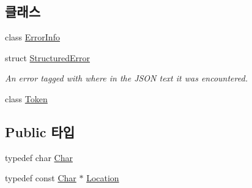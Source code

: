 \subsection*{클래스}
\begin{DoxyCompactItemize}
\item 
class \hyperlink{class_json_1_1_reader_1_1_error_info}{Error\+Info}
\item 
struct \hyperlink{struct_json_1_1_reader_1_1_structured_error}{Structured\+Error}
\begin{DoxyCompactList}\small\item\em An error tagged with where in the J\+S\+ON text it was encountered. \end{DoxyCompactList}\item 
class \hyperlink{class_json_1_1_reader_1_1_token}{Token}
\end{DoxyCompactItemize}
\subsection*{Public 타입}
\begin{DoxyCompactItemize}
\item 
typedef char \hyperlink{class_json_1_1_reader_a3eec9118f3e9a672ba8348c3a79d0f45}{Char}
\item 
typedef const \hyperlink{class_json_1_1_reader_a3eec9118f3e9a672ba8348c3a79d0f45}{Char} $\ast$ \hyperlink{class_json_1_1_reader_a46795b5b272bf79a7730e406cb96375a}{Location}
\end{DoxyCompactItemize}
